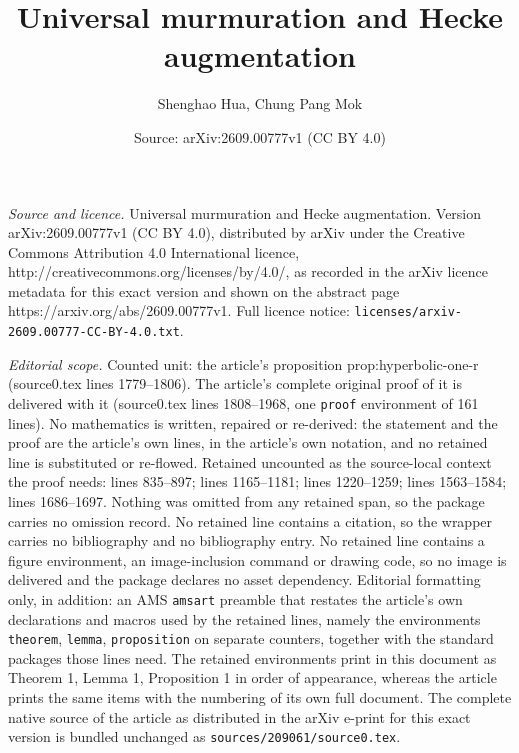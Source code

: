 \documentclass[10pt,a4paper]{amsart}
\title{Universal murmuration and Hecke augmentation}
\author{Shenghao Hua, Chung Pang Mok}
\date{Source: arXiv:2609.00777v1 (CC BY 4.0)}
\begin{document}
\maketitle

\noindent\emph{Source and licence.} Universal murmuration and Hecke augmentation. Version arXiv:2609.00777v1 (CC BY 4.0), distributed by arXiv under the Creative Commons Attribution 4.0 International licence, http://creativecommons.org/licenses/by/4.0/, as recorded in the arXiv licence metadata for this exact version and shown on the abstract page https://arxiv.org/abs/2609.00777v1. Full licence notice: \texttt{licenses/arxiv-2609.00777-CC-BY-4.0.txt}.\par\smallskip

\noindent\textit{Editorial scope.} Counted unit: the article's proposition prop:hyperbolic-one-r (source0.tex lines 1779--1806). The article's complete original proof of it is delivered with it (source0.tex lines 1808--1968, one \texttt{proof} environment of 161 lines). No mathematics is written, repaired or re-derived: the statement and the proof are the article's own lines, in the article's own notation, and no retained line is substituted or re-flowed.  Retained uncounted as the source-local context the proof needs: lines 835--897; lines 1165--1181; lines 1220--1259; lines 1563--1584; lines 1686--1697.  Nothing was omitted from any retained span, so the package carries no omission record.  No retained line contains a citation, so the wrapper carries no bibliography and no bibliography entry.  No retained line contains a figure environment, an image-inclusion command or drawing code, so no image is delivered and the package declares no asset dependency.  Editorial formatting only, in addition: an AMS \texttt{amsart} preamble that restates the article's own declarations and macros used by the retained lines, namely the environments \texttt{theorem}, \texttt{lemma}, \texttt{proposition} on separate counters, together with the standard packages those lines need.  The retained environments print in this document as Theorem 1, Lemma 1, Proposition 1 in order of appearance, whereas the article prints the same items with the numbering of its own full document.  The complete native source of the article as distributed in the arXiv e-print for this exact version is bundled unchanged as \texttt{sources/209061/source0.tex}.
\end{document}
